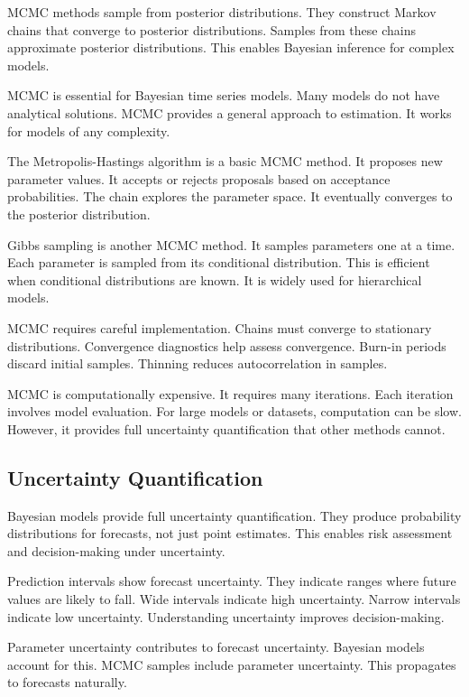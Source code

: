 MCMC methods sample from posterior distributions. They construct Markov chains that converge to posterior distributions. Samples from these chains approximate posterior distributions. This enables Bayesian inference for complex models.

MCMC is essential for Bayesian time series models. Many models do not have analytical solutions. MCMC provides a general approach to estimation. It works for models of any complexity.

The Metropolis-Hastings algorithm is a basic MCMC method. It proposes new parameter values. It accepts or rejects proposals based on acceptance probabilities. The chain explores the parameter space. It eventually converges to the posterior distribution.

Gibbs sampling is another MCMC method. It samples parameters one at a time. Each parameter is sampled from its conditional distribution. This is efficient when conditional distributions are known. It is widely used for hierarchical models.

MCMC requires careful implementation. Chains must converge to stationary distributions. Convergence diagnostics help assess convergence. Burn-in periods discard initial samples. Thinning reduces autocorrelation in samples.

MCMC is computationally expensive. It requires many iterations. Each iteration involves model evaluation. For large models or datasets, computation can be slow. However, it provides full uncertainty quantification that other methods cannot.

\subsection{Uncertainty Quantification}

Bayesian models provide full uncertainty quantification. They produce probability distributions for forecasts, not just point estimates. This enables risk assessment and decision-making under uncertainty.

Prediction intervals show forecast uncertainty. They indicate ranges where future values are likely to fall. Wide intervals indicate high uncertainty. Narrow intervals indicate low uncertainty. Understanding uncertainty improves decision-making.

Parameter uncertainty contributes to forecast uncertainty. Bayesian models account for this. MCMC samples include parameter uncertainty. This propagates to forecasts naturally.

